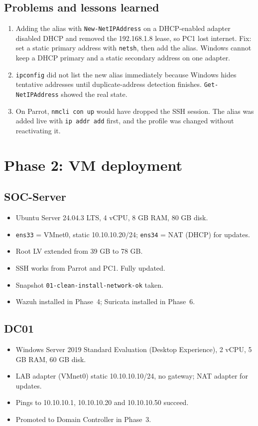 \documentclass[11pt,a4paper]{article}
\begin{document}
\subsection{Problems and lessons learned}
\begin{enumerate}
  \item Adding the alias with \texttt{New-NetIPAddress} on a DHCP-enabled
        adapter disabled DHCP and removed the 192.168.1.8 lease, so PC1 lost
        internet. Fix: set a static primary address with \texttt{netsh}, then
        add the alias. Windows cannot keep a DHCP primary and a static
        secondary address on one adapter.
  \item \texttt{ipconfig} did not list the new alias immediately because
        Windows hides tentative addresses until duplicate-address detection
        finishes. \texttt{Get-NetIPAddress} showed the real state.
  \item On Parrot, \texttt{nmcli con up} would have dropped the SSH session.
        The alias was added live with \texttt{ip addr add} first, and the
        profile was changed without reactivating it.
\end{enumerate}

\section{Phase 2: VM deployment}

\subsection{SOC-Server}
\begin{itemize}
  \item Ubuntu Server 24.04.3 LTS, 4 vCPU, 8 GB RAM, 80 GB disk.
  \item \texttt{ens33} = VMnet0, static 10.10.10.20/24;
        \texttt{ens34} = NAT (DHCP) for updates.
  \item Root LV extended from 39 GB to 78 GB.
  \item SSH works from Parrot and PC1. Fully updated.
  \item Snapshot \texttt{01-clean-install-network-ok} taken.
  \item Wazuh installed in Phase~4; Suricata installed in Phase~6.
\end{itemize}

\subsection{DC01}
\begin{itemize}
  \item Windows Server 2019 Standard Evaluation (Desktop Experience),
        2 vCPU, 5 GB RAM, 60 GB disk.
  \item LAB adapter (VMnet0) static 10.10.10.10/24, no gateway; NAT adapter
        for updates.
  \item Pings to 10.10.10.1, 10.10.10.20 and 10.10.10.50 succeed.
  \item Promoted to Domain Controller in Phase~3.
\end{itemize}
\end{document}
